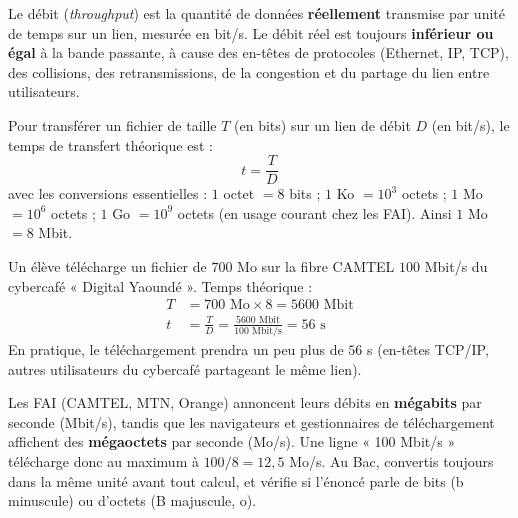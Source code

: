 \documentclass[11pt]{article}
\newcommand{\cle}[1]{{\popxbold\color{popdark}#1}}
\begin{document}
\begin{definition}[Débit]
Le \cle{débit} (\emph{throughput}) est la quantité de données \textbf{réellement} transmise par unité de temps sur un lien, mesurée en bit/s. Le débit réel est toujours \textbf{inférieur ou égal} à la bande passante, à cause des en-têtes de protocoles (Ethernet, IP, TCP), des collisions, des retransmissions, de la congestion et du partage du lien entre utilisateurs.
\end{definition}

\begin{propriete}
Pour transférer un fichier de taille $T$ (en bits) sur un lien de débit $D$ (en bit/s), le temps de transfert théorique est :
\[ t = \frac{T}{D} \]
avec les conversions essentielles : $1$ octet $= 8$ bits ; $1$ Ko $= 10^3$ octets ; $1$ Mo $= 10^6$ octets ; $1$ Go $= 10^9$ octets (en usage courant chez les FAI). Ainsi $1$ Mo $= 8$ Mbit.
\end{propriete}

\begin{exemplebox}
Un élève télécharge un fichier de $700$ Mo sur la fibre CAMTEL $100$ Mbit/s du cybercafé « Digital Yaoundé ». Temps théorique :
\begin{align*}
T &= 700 \text{ Mo} \times 8 = 5600 \text{ Mbit}\\
t &= \frac{T}{D} = \frac{5600 \text{ Mbit}}{100 \text{ Mbit/s}} = 56 \text{ s}
\end{align*}
En pratique, le téléchargement prendra un peu plus de $56$ s (en-têtes TCP/IP, autres utilisateurs du cybercafé partageant le même lien).
\end{exemplebox}

\begin{attention}
Les FAI (CAMTEL, MTN, Orange) annoncent leurs débits en \textbf{mégabits} par seconde (Mbit/s), tandis que les navigateurs et gestionnaires de téléchargement affichent des \textbf{mégaoctets} par seconde (Mo/s). Une ligne « 100 Mbit/s » télécharge donc au maximum à $100 / 8 = 12,5$ Mo/s. Au Bac, convertis toujours dans la même unité avant tout calcul, et vérifie si l'énoncé parle de bits (b minuscule) ou d'octets (B majuscule, o).
\end{attention}
\end{document}
